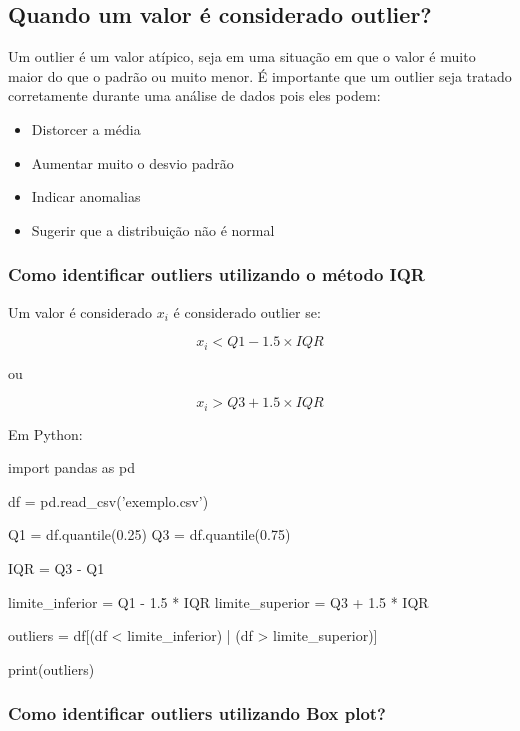 \documentclass{article}
\begin{document}
\subsection{Quando um valor é considerado outlier?}

Um outlier é um valor atípico, seja em uma situação em que o valor é muito maior do que o padrão ou muito menor. É importante que um outlier seja tratado corretamente durante uma análise de dados pois eles podem: 

\begin{itemize}
    \item Distorcer a média
    \item Aumentar muito o desvio padrão
    \item Indicar anomalias 
    \item Sugerir que a distribuição não é normal
\end{itemize}

\subsubsection{Como identificar outliers utilizando o método IQR}

Um valor é considerado $x_{i}$ é considerado outlier se:

\begin{equation}
    x_{i} < Q1 - 1.5 \times IQR
\end{equation}

ou

\begin{equation}
    x_{i} > Q3 + 1.5 \times IQR
\end{equation}

Em Python:

\begin{pythoncode}
import pandas as pd 

df = pd.read_csv('exemplo.csv')

Q1 = df.quantile(0.25)
Q3 = df.quantile(0.75)

IQR = Q3 - Q1

limite_inferior = Q1 - 1.5 * IQR
limite_superior = Q3 + 1.5 * IQR

outliers = df[(df < limite_inferior) | (df > limite_superior)]

print(outliers)
\end{pythoncode}

\subsubsection{Como identificar outliers utilizando Box plot?}
\end{document}
